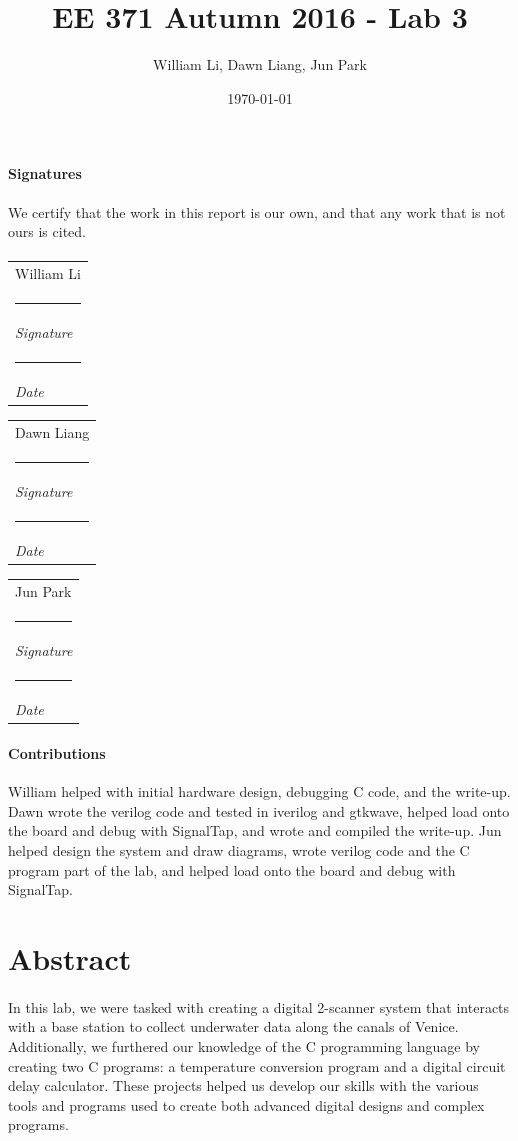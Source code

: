 \documentclass{article}
\title{EE 371 Autumn 2016 - Lab 3}
\date{\today}
\author{William Li, Dawn Liang, Jun Park}
\begin{document}
\newcommand{\namesigdate}[2][5cm]{
  \begin{tabular}{@{}p{#1}@{}}
    #2 \\[2\normalbaselineskip] \hrule \\[0pt]
    {\small \textit{Signature}} \\[2\normalbaselineskip] \hrule \\[0pt]
    {\small \textit{Date}}
  \end{tabular}
}

\maketitle
\newpage

\paragraph{Signatures} We certify that the work in this report is our own, and that any work that is not ours is cited.
\paragraph{} \noindent \namesigdate{William Li} \hfill \namesigdate{Dawn Liang} \hfill \namesigdate{Jun Park}

\paragraph{Contributions} William helped with initial hardware design, debugging C code, and the write-up. Dawn wrote the verilog code and tested in iverilog and gtkwave, helped load onto the board and debug with SignalTap, and wrote and compiled the write-up. Jun helped design the system and draw diagrams, wrote verilog code and the C program part of the lab, and helped load onto the board and debug with SignalTap.

\newpage

\tableofcontents
\newpage


\section{Abstract}
\paragraph{} In this lab, we were tasked with creating a digital 2-scanner system that interacts with a base station to collect underwater data along the canals of Venice. Additionally, we furthered our knowledge of the C programming language by creating two C programs: a temperature conversion program and a digital circuit delay calculator. These projects helped us develop our skills with the various tools and programs used to create both advanced digital designs and complex programs.
\end{document}
